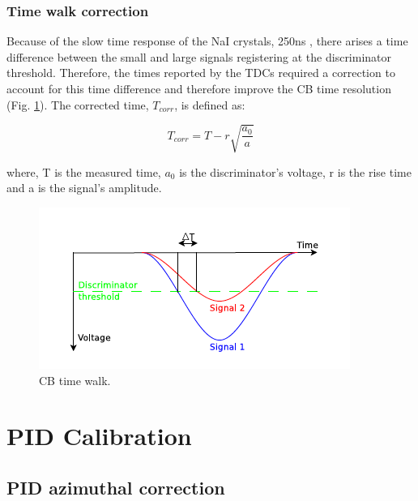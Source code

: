 \subsubsection{Time walk correction}

\indent Because of the slow time response of the NaI crystals, 250ns \cite{knoll}, there arises a time difference between the small and large signals registering at the discriminator threshold. Therefore, the times reported by the TDCs required a correction to account for this time difference and therefore improve the CB time resolution (Fig. \ref{cbtimewalk}). The corrected time, $T_{corr}$, is defined as:

\begin{equation}
T_{corr}=T - r\sqrt{\frac{a_{0}}{a}}
\end{equation}

where, T is the measured time, $a_{0}$ is the discriminator's voltage, r is the rise time and a is the signal's amplitude.

\begin{figure}[H]
\begin{center}
\includegraphics[scale=0.55]{pictures/png/cbtimewalk.png}
\caption{CB time walk.}
\label{cbtimewalk}
\end{center}
\end{figure}

\section{PID Calibration}

\subsection{PID azimuthal correction}

